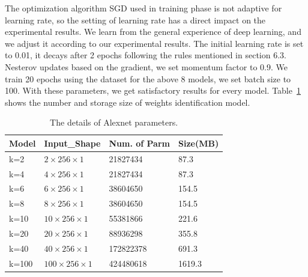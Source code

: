 \documentclass[conference]{IEEEtran}
\begin{document}
The optimization algorithm SGD used in training phase is not adaptive for learning rate, so the setting of learning rate has a direct impact on the experimental results. We learn from the general experience of deep learning, and we adjust it according to our experimental results. The initial learning rate is set to 0.01, it decays after 2 epochs following the rules mentioned in section 6.3.  Nesterov updates based on the gradient, we set momentum factor to 0.9. We train 20 epochs using the dataset for the above 8 models, we set batch size to 100. With these parameters, we get satisfactory results for every model. Table~\ref{tab:params} shows the number and storage size of weights identification model.
\begin{table}
  \caption{The details of Alexnet parameters.}
  \label{tab:params}
  \centering
  \begin{tabular}{p{1cm}p{2cm}p{2cm}p{1cm}}
    \hline
    Model & Input\_Shape &Num. of Parm &Size(MB)\\
    \hline
    k=2      & ${2 \times 256 \times 1}$  & 21827434  &87.3  \\
    k=4      & ${4 \times 256 \times 1}$  & 21827434  &87.3  \\
    k=6      & ${6 \times 256 \times 1}$  & 38604650  &154.5  \\
    k=8      & ${8 \times 256 \times 1}$  & 38604650  &154.5 \\
    k=10     & ${10 \times 256 \times 1}$  & 55381866  &221.6  \\
    k=20     & ${20 \times 256 \times 1}$  & 88936298  &355.8 \\
    k=40     & ${40 \times 256 \times 1}$  & 172822378  &691.3  \\
    k=100    & ${100 \times 256 \times 1}$  & 424480618  &1619.3  \\
    \hline
  \end{tabular}
\end{table}
\end{document}
